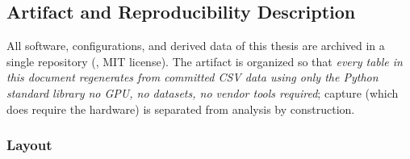 \subsection{Artifact and Reproducibility Description}
\label{app:artifacts}

All software, configurations, and derived data of this thesis are archived
in a single repository (, MIT
license). The artifact is organized so that \emph{every table in this
document regenerates from committed CSV data using only the Python standard
library no GPU, no datasets, no vendor tools required}; capture (which
does require the hardware) is separated from analysis by construction.

\subsubsection{Layout}

